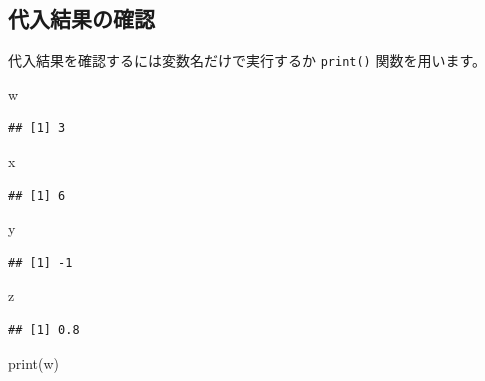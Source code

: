 \documentclass[
  12pt,
]{book}
\newenvironment{Shaded}{\begin{snugshade}}{\end{snugshade}}
\newcommand{\FunctionTok}[1]{\textcolor[rgb]{0.00,0.00,0.00}{#1}}
\newcommand{\NormalTok}[1]{#1}
\begin{document}
\hypertarget{ux4ee3ux5165ux7d50ux679cux306eux78baux8a8d}{%
\subsection{代入結果の確認}\label{ux4ee3ux5165ux7d50ux679cux306eux78baux8a8d}}

代入結果を確認するには変数名だけで実行するか \texttt{print()} 関数を用います。

\begin{Shaded}
\begin{Highlighting}[numbers=left,,]
\NormalTok{w}
\end{Highlighting}
\end{Shaded}

\begin{verbatim}
## [1] 3
\end{verbatim}

\begin{Shaded}
\begin{Highlighting}[numbers=left,,]
\NormalTok{x}
\end{Highlighting}
\end{Shaded}

\begin{verbatim}
## [1] 6
\end{verbatim}

\begin{Shaded}
\begin{Highlighting}[numbers=left,,]
\NormalTok{y}
\end{Highlighting}
\end{Shaded}

\begin{verbatim}
## [1] -1
\end{verbatim}

\begin{Shaded}
\begin{Highlighting}[numbers=left,,]
\NormalTok{z}
\end{Highlighting}
\end{Shaded}

\begin{verbatim}
## [1] 0.8
\end{verbatim}

\begin{Shaded}
\begin{Highlighting}[numbers=left,,]
\FunctionTok{print}\NormalTok{(w)}
\end{Highlighting}
\end{Shaded}
\end{document}
